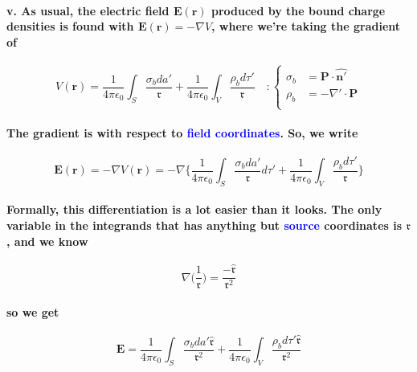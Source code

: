 \documentclass{article}
\begin{document}
\paragraph{\indent \indent v. As usual, the electric field $\boldsymbol{E}(\boldsymbol{r})$ produced by the bound charge densities is found with $\boldsymbol{E}(\boldsymbol{r})=-\nabla V$, where we're taking the gradient of}
\begin{equation*}
    V(\boldsymbol{r})=\frac{1}{4\pi\epsilon_0}\int_S \frac{\sigma_b da'}{\mathfrak{r}}+\frac{1}{4\pi\epsilon_0}\int_V \frac{\rho_b d\tau'}{\mathfrak{r}}\quad:\begin{cases}
        \sigma_b & =\boldsymbol{P}\cdot \hat{\boldsymbol{n'}}\\
        \rho_b & =-\nabla'\cdot\boldsymbol{P}\\
    \end{cases}
\end{equation*}
\paragraph{The gradient is with respect to \textcolor{blue}{field coordinates}. So, we write}
\begin{equation*}
    \boldsymbol{E}(\boldsymbol{r})=-\nabla V(\boldsymbol{r})=-\nabla \bigg\{ \frac{1}{4\pi\epsilon_0}\int_S\frac{\sigma_b da'}{\mathfrak{r}}d\tau'+\frac{1}{4\pi\epsilon_0}\int_V\frac{\rho_b d\tau'}{\mathfrak{r}}\bigg\}
\end{equation*}
\paragraph{Formally, this differentiation is a lot easier than it looks. The only variable in the integrands that has anything but \textcolor{blue}{source} coordinates is $\mathfrak{r}$, and we know}
\begin{equation*}
    \nabla\bigg(\frac{1}{\boldsymbol{\mathfrak{r}}}\bigg)=\frac{-\hat{\boldsymbol{\mathfrak{r}}}}{\mathfrak{r}^2}
\end{equation*}
\paragraph{so we get}
\begin{equation*}
    \boldsymbol{E}=\frac{1}{4\pi\epsilon_0}\int_S \frac{\sigma_b da'\hat{\boldsymbol{\mathfrak{r}}}}{\mathfrak{r}^2}+\frac{1}{4\pi\epsilon_0}\int_V \frac{\rho_b d\tau'\hat{\boldsymbol{\mathfrak{r}}}}{\mathfrak{r}^2}
\end{equation*}
\end{document}
